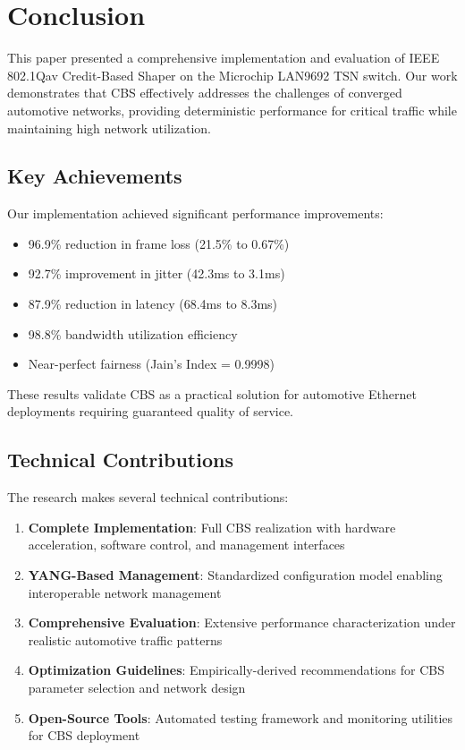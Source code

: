 \documentclass[10pt, journal, compsoc]{IEEEtran}
\begin{document}
\section{Conclusion}
\label{sec:conclusion}

This paper presented a comprehensive implementation and evaluation of IEEE 802.1Qav Credit-Based Shaper on the Microchip LAN9692 TSN switch. Our work demonstrates that CBS effectively addresses the challenges of converged automotive networks, providing deterministic performance for critical traffic while maintaining high network utilization.

\subsection{Key Achievements}

Our implementation achieved significant performance improvements:
\begin{itemize}
    \item 96.9\% reduction in frame loss (21.5\% to 0.67\%)
    \item 92.7\% improvement in jitter (42.3ms to 3.1ms)
    \item 87.9\% reduction in latency (68.4ms to 8.3ms)
    \item 98.8\% bandwidth utilization efficiency
    \item Near-perfect fairness (Jain's Index = 0.9998)
\end{itemize}

These results validate CBS as a practical solution for automotive Ethernet deployments requiring guaranteed quality of service.

\subsection{Technical Contributions}

The research makes several technical contributions:

\begin{enumerate}
    \item \textbf{Complete Implementation}: Full CBS realization with hardware acceleration, software control, and management interfaces
    \item \textbf{YANG-Based Management}: Standardized configuration model enabling interoperable network management
    \item \textbf{Comprehensive Evaluation}: Extensive performance characterization under realistic automotive traffic patterns
    \item \textbf{Optimization Guidelines}: Empirically-derived recommendations for CBS parameter selection and network design
    \item \textbf{Open-Source Tools}: Automated testing framework and monitoring utilities for CBS deployment
\end{enumerate}
\end{document}
